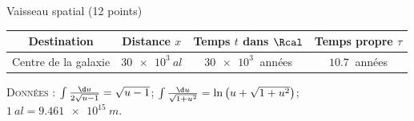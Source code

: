\begin{exo}[PC][1][devoir]{Vaisseau spatial (12 points)}
\begin{quest}
{\begin{center}
      \begin{tabular}{|c|c|c|c|}
        \hline
        Destination & Distance $x$ & Temps $t$ dans $\Rcal$ & Temps propre $\tau$ \\
        \hline
        Centre de la galaxie & $\SI{30e3}{al}$ & $\SI{30e3}{}$ années & $\SI{10.7}{}$ années \\
        \hline
      \end{tabular}
        \end{center}
  }
\end{quest}

\textsc{Données} : $\int \frac{\d u}{2\sqrt{u-1}} = \sqrt{u-1}$; $\int \frac{\d u}{\sqrt{1+u^2}} = \ln\left(u+\sqrt{1+u^2}\right)$; $\SI{1}{al} = \SI{9,461e15}{m}$.
  \end{exo}


